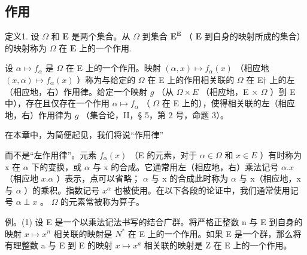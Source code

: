 \subsection{作用}

定义1. 设 \(\Omega\) 和 \(\mathbf{E}\) 是两个集合。从 \(\Omega\) 到集合 \(\mathbf{E}^{\mathbf{E}}\) （ \(\mathbf{E}\) 到自身的映射所成的集合）的映射称为 \(\Omega\) 在 \(\mathbf{E}\) 上的一个作用.

设 \(\alpha \mapsto f_{\alpha}\) 是 \(\Omega\) 在 E 上的一个作用。映射 \((\alpha, x) \mapsto f_{\alpha}(x)\) （相应地 \((x, \alpha) \mapsto f_{\alpha}(x)\) ）称为与给定的 \(\Omega\) 在 E 上的作用相关联的 \(\Omega\) 在 E† 上的左（相应地，右）作用律。给定一个映射 \(g\) （从 \(\Omega \times E\) （相应地，E × \(\Omega\) ）到 E 中），存在且仅存在一个作用 \(\alpha \mapsto f_{\alpha}\) （ \(\Omega\) 在 E 上的），使得相关联的左（相应地，右）作用律为 \(g\) （集合论，II，§ 5，第 2 号，命题 3）。

在本章中，为简便起见，我们将说“作用律”

而不是“左作用律”。元素 \(f_{\alpha}(x)\) （E 的元素，对于 \(\alpha \in \Omega\) 和 \(x \in E\) ）有时称为 x 在 \(\alpha\) 下的变换，或 \(\alpha\) 与 x 的合成。它通常用左（相应地，右）乘法记号 \(\alpha.x\) （相应地 \(x.\alpha\) ）表示，点可以省略； \(\alpha\) 与 x 的合成此时称为 \(\alpha\) 与 x（相应地，x 与 \(\alpha\) ）的乘积。指数记号 \(x^{\alpha}\) 也被使用。在以下各段的论证中，我们通常使用记号 \(\alpha \perp x\) 。 \(\Omega\) 的元素常被称为算子。

例。(1) 设 E 是一个以乘法记法书写的结合广群。将严格正整数 n 与 E 到自身的映射 \(x \mapsto x^{n}\) 相关联的映射是 \(N^{*}\) 在 E 上的一个作用。如果 E 是一个群，那么将有理整数 a 与 E 到 E 的映射 \(x \mapsto x^{a}\) 相关联的映射是 Z 在 E 上的一个作用。

